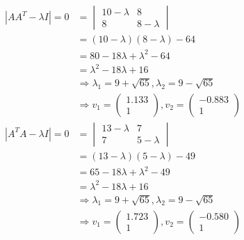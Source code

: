 \documentclass[12pt, letterpaper]{article}
\begin{document}
\begin{enumerate}
\begin{equation*}
\begin{aligned}
            |AA^{T} - \lambda I| = 0
            & =
            \begin{vmatrix}
                10 - \lambda & 8 \\
                8 & 8 - \lambda
            \end{vmatrix} \\
            & = (10-\lambda)(8-\lambda) - 64 \\
            & = 80 - 18\lambda + \lambda ^{2} - 64 \\
            & = \lambda ^{2} - 18\lambda + 16 \\
            & \Rightarrow \lambda_{1} = 9+\sqrt{65}, \lambda_{2} = 9-\sqrt{65} \\
            & \Rightarrow v_{1} = \begin{pmatrix}
                1.133 \\
                1
            \end{pmatrix},
            v_{2} = \begin{pmatrix}
                -0.883 \\
                1
            \end{pmatrix}
        \end{aligned}
    \end{equation*}
    \begin{equation*} 
        \begin{aligned}
            |A^{T}A - \lambda I| = 0
            & =
            \begin{vmatrix}
                13 - \lambda & 7 \\
                7 & 5 - \lambda
            \end{vmatrix} \\
            & = (13-\lambda)(5-\lambda) - 49 \\
            & = 65 - 18\lambda + \lambda ^{2} - 49 \\
            & = \lambda ^{2} - 18\lambda + 16 \\
            & \Rightarrow \lambda_{1} = 9+\sqrt{65}, \lambda_{2} = 9-\sqrt{65} \\
            & \Rightarrow v_{1} = \begin{pmatrix}
                1.723 \\
                1
            \end{pmatrix},
            v_{2} = \begin{pmatrix}
                -0.580 \\
                1
            \end{pmatrix}

\end{aligned}
\end{equation*}
\end{enumerate}
\end{document}
